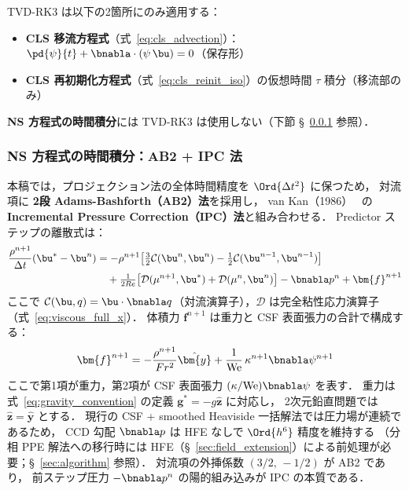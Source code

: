 \label{warn:tvd_rk3_scope}
TVD-RK3 は以下の2箇所にのみ適用する：
\begin{itemize}
  \item \textbf{CLS 移流方程式}（式~\eqref{eq:cls_advection}）：$\pd{\psi}{t} + \bnabla\cdot(\psi\,\bu) = 0$（保存形）
  \item \textbf{CLS 再初期化方程式}（式~\eqref{eq:cls_reinit_iso}）の仮想時間 $\tau$ 積分（移流部のみ）
\end{itemize}
\textbf{NS 方程式の時間積分}には TVD-RK3 は使用しない（下節 §~\ref{sec:ab2_ipc} 参照）．

\subsubsection{NS 方程式の時間積分：AB2 + IPC 法}
\label{sec:ab2_ipc}

本稿では，プロジェクション法の全体時間精度を $\Ord{\Delta t^2}$ に保つため，
対流項に \textbf{2段 Adams-Bashforth（AB2）法}を採用し，
van Kan（1986）~\cite{vanKan1986} の \textbf{Incremental Pressure Correction（IPC）法}と組み合わせる．
Predictor ステップの離散式は：
\begin{equation}
\begin{split}
  \frac{\rho^{n+1}}{\Delta t}(\bu^* - \bu^n)
  &= -\rho^{n+1}\!\left[\tfrac{3}{2}\mathcal{C}(\bu^n,\bu^n)
    - \tfrac{1}{2}\mathcal{C}(\bu^{n-1},\bu^{n-1})\right] \\
  &\quad + \tfrac{1}{2Re}\bigl[\mathcal{D}(\mu^{n+1},\bu^*)
    + \mathcal{D}(\mu^n,\bu^n)\bigr]
  - \bnabla p^n
  + \bm{f}^{n+1}
\end{split}
  \label{eq:predictor_ab2_ipc}
\end{equation}
ここで $\mathcal{C}(\bu,q) = \bu\cdot\bnabla q$（対流演算子），$\mathcal{D}$ は完全粘性応力演算子
（式~\eqref{eq:viscous_full_x}）．
体積力 $\bm{f}^{n+1}$ は重力と CSF 表面張力の合計で構成する：
\begin{equation*}
  \bm{f}^{n+1} = - \frac{\rho^{n+1}}{Fr^2}\hat{\bm{y}}
  + \frac{1}{\mathrm{We}}\,\kappa^{n+1}\bnabla\psi^{n+1}
\end{equation*}
ここで第1項が重力，第2項が CSF 表面張力 $(\kappa/\mathrm{We})\bnabla\psi$ を表す．
重力は式~\eqref{eq:gravity_convention} の定義 $\bm{g}^* = -g\hat{\bm{z}}$ に対応し，
2次元鉛直問題では $\hat{\bm{z}} = \hat{\bm{y}}$ とする．
現行の CSF + smoothed Heaviside 一括解法では圧力場が連続であるため，
CCD 勾配 $\bnabla p$ は HFE なしで $\Ord{h^6}$ 精度を維持する
（分相 PPE 解法への移行時には HFE（§~\ref{sec:field_extension}）による前処理が必要；§~\ref{sec:algorithm} 参照）．
対流項の外挿係数 $(3/2,\,-1/2)$ が AB2 であり，
前ステップ圧力 $-\bnabla p^n$ の陽的組み込みが IPC の本質である．

